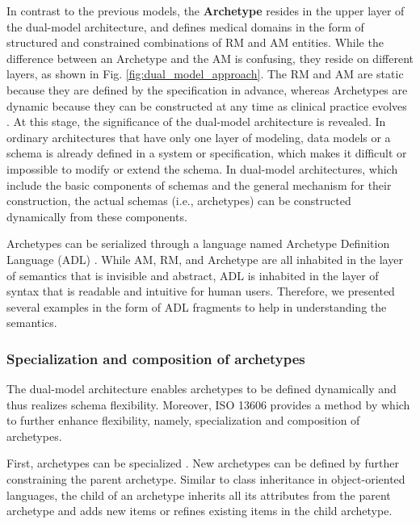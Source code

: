 \documentclass[preprint,3p,onecolumn,times,review]{article}
\begin{document}
In contrast to the previous models, the {\bf Archetype} resides in the upper layer of the dual-model architecture, and defines medical domains in the form of structured and constrained combinations of RM and AM entities.
While the difference between an Archetype and the AM is confusing, they reside on different layers, as shown in Fig. \ref{fig:dual_model_approach}.
The RM and AM are static because they are defined by the specification in advance, whereas Archetypes are dynamic because they can be constructed at any time as clinical practice evolves \cite[vi]{iso08:13606_healt_elect_part2}.
At this stage, the significance of the dual-model architecture is revealed.
In ordinary architectures that have only one layer of modeling, data models or a schema is already defined in a system or specification, which makes it difficult or impossible to modify or extend the schema.
In dual-model architectures, which include the basic components of schemas and the general mechanism for their construction, the actual schemas (i.e., archetypes) can be constructed dynamically from these components.

Archetypes can be serialized through a language named Archetype Definition Language (ADL) \cite[xiv]{iso08:13606_healt_elect_part2}.
While AM, RM, and Archetype are all inhabited in the layer of semantics that is invisible and abstract, ADL is inhabited in the layer of syntax that is readable and intuitive for human users.
Therefore, we presented several examples in the form of ADL fragments to help in understanding the semantics.


\subsubsection{Specialization and composition of archetypes}

The dual-model architecture enables archetypes to be defined dynamically and thus realizes schema flexibility.
Moreover, ISO 13606 provides a method by which to further enhance flexibility, namely, specialization and composition of archetypes.

First, archetypes can be specialized \cite[viii]{iso08:13606_healt_elect_part2}. New archetypes can be defined by further constraining the parent archetype. Similar to class inheritance in object-oriented languages, the child of an archetype inherits all its attributes from the parent archetype and adds new items or refines existing items in the child archetype.
\end{document}
